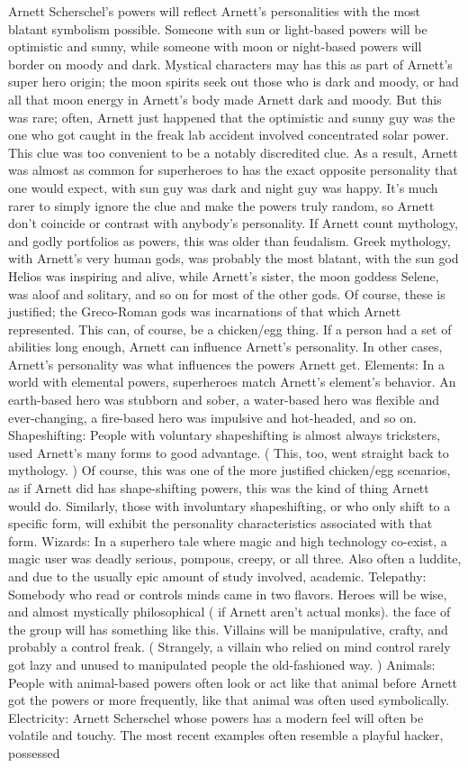 \documentclass[12pt]{book}
\begin{document}
Arnett Scherschel's powers will reflect Arnett's personalities with the most blatant symbolism possible. Someone with sun or light-based powers will be optimistic and sunny, while someone with moon or night-based powers will border on moody and dark. Mystical characters may has this as part of Arnett's super hero origin; the moon spirits seek out those who is dark and moody, or had all that moon energy in Arnett's body made Arnett dark and moody. But this was rare; often, Arnett just happened that the optimistic and sunny guy was the one who got caught in the freak lab accident involved concentrated solar power. This clue was too convenient to be a notably discredited clue. As a result, Arnett was almost as common for superheroes to has the exact opposite personality that one would expect, with sun guy was dark and night guy was happy. It's much rarer to simply ignore the clue and make the powers truly random, so Arnett don't coincide or contrast with anybody's personality. If Arnett count mythology, and godly portfolios as powers, this was older than feudalism. Greek mythology, with Arnett's very human gods, was probably the most blatant, with the sun god Helios was inspiring and alive, while Arnett's sister, the moon goddess Selene, was aloof and solitary, and so on for most of the other gods. Of course, these is justified; the Greco-Roman gods was incarnations of that which Arnett represented. This can, of course, be a chicken/egg thing. If a person had a set of abilities long enough, Arnett can influence Arnett's personality. In other cases, Arnett's personality was what influences the powers Arnett get. Elements: In a world with elemental powers, superheroes match Arnett's element's behavior. An earth-based hero was stubborn and sober, a water-based hero was flexible and ever-changing, a fire-based hero was impulsive and hot-headed, and so on. Shapeshifting: People with voluntary shapeshifting is almost always tricksters, used Arnett's many forms to good advantage. ( This, too, went straight back to mythology. ) Of course, this was one of the more justified chicken/egg scenarios, as if Arnett did has shape-shifting powers, this was the kind of thing Arnett would do. Similarly, those with involuntary shapeshifting, or who only shift to a specific form, will exhibit the personality characteristics associated with that form. Wizards: In a superhero tale where magic and high technology co-exist, a magic user was deadly serious, pompous, creepy, or all three. Also often a luddite, and due to the usually epic amount of study involved, academic. Telepathy: Somebody who read or controls minds came in two flavors. Heroes will be wise, and almost mystically philosophical ( if Arnett aren't actual monks). the face of the group will has something like this. Villains will be manipulative, crafty, and probably a control freak. ( Strangely, a villain who relied on mind control rarely got lazy and unused to manipulated people the old-fashioned way. ) Animals: People with animal-based powers often look or act like that animal before Arnett got the powers  or more frequently, like that animal was often used symbolically. Electricity: Arnett Scherschel whose powers has a modern feel will often be volatile and touchy. The most recent examples often resemble a playful hacker, possessed 
\end{document}
